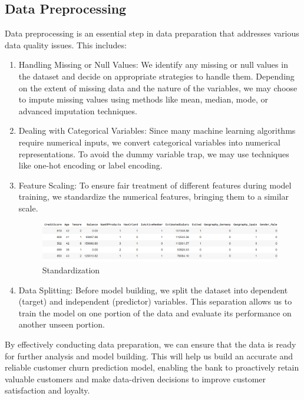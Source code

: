 \documentclass[11pt,a4paper]{article}
\begin{document}
\subsection{Data Preprocessing}

Data preprocessing is an essential step in data preparation that addresses various data quality issues. This includes:

\begin{enumerate}
    \item Handling Missing or Null Values: We identify any missing or null values in the dataset and decide on appropriate strategies to handle them. Depending on the extent of missing data and the nature of the variables, we may choose to impute missing values using methods like mean, median, mode, or advanced imputation techniques.
    \item Dealing with Categorical Variables: Since many machine learning algorithms require numerical inputs, we convert categorical variables into numerical representations. To avoid the dummy variable trap, we may use techniques like one-hot encoding or label encoding.
    \item Feature Scaling: To ensure fair treatment of different features during model training, we standardize the numerical features, bringing them to a similar scale.
    

\begin{figure}[H]
    \centering
    \includegraphics[width=1\textwidth]{Numerical.png}
    \caption{Standardization}
    \label{fig:enter-label}
\end{figure}

    
    \item Data Splitting: Before model building, we split the dataset into dependent (target) and independent (predictor) variables. This separation allows us to train the model on one portion of the data and evaluate its performance on another unseen portion.
\end{enumerate}

By effectively conducting data preparation, we can ensure that the data is ready for further analysis and model building. This will help us build an accurate and reliable customer churn prediction model, enabling the bank to proactively retain valuable customers and make data-driven decisions to improve customer satisfaction and loyalty.
\end{document}
